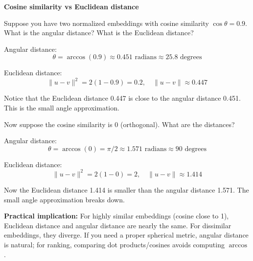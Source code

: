 \vspace{1.5em}

\begin{examplebox}
\textbf{Cosine similarity vs Euclidean distance}

\vspace{0.5em}

Suppose you have two normalized embeddings with cosine similarity $\cos\theta = 0.9$. What is the angular distance? What is the Euclidean distance?

\vspace{0.5em}

Angular distance:
\begin{equation*}
\theta = \arccos(0.9) \approx 0.451 \text{ radians} \approx 25.8 \text{ degrees}
\end{equation*}

Euclidean distance:
\begin{equation*}
\|u - v\|^2 = 2(1 - 0.9) = 0.2, \quad \|u - v\| \approx 0.447
\end{equation*}

Notice that the Euclidean distance 0.447 is close to the angular distance 0.451. This is the small angle approximation.

\vspace{0.5em}

Now suppose the cosine similarity is 0 (orthogonal). What are the distances?

\vspace{0.5em}

Angular distance:
\begin{equation*}
\theta = \arccos(0) = \pi/2 \approx 1.571 \text{ radians} \approx 90 \text{ degrees}
\end{equation*}

Euclidean distance:
\begin{equation*}
\|u - v\|^2 = 2(1 - 0) = 2, \quad \|u - v\| \approx 1.414
\end{equation*}

Now the Euclidean distance 1.414 is smaller than the angular distance 1.571. The small angle approximation breaks down.

\vspace{0.5em}

\textbf{Practical implication:} For highly similar embeddings (cosine close to 1), Euclidean distance and angular distance are nearly the same. For dissimilar embeddings, they diverge. If you need a proper spherical metric, angular distance is natural; for ranking, comparing dot products/cosines avoids computing $\arccos$.
\end{examplebox}

